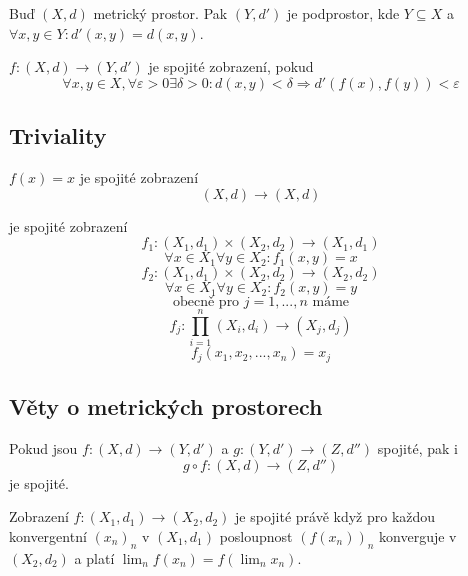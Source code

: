 \documentclass[../main.tex]{subfiles}
\begin{document}
\begin{definition}[Podprostor]
	Buď $(X, d)$ metrický prostor. Pak $(Y, d')$ je podprostor, kde $Y \subseteq X$ a $\forall x,y \in Y : d'(x,y) = d(x,y)$.
\end{definition}

\begin{definition}
	$f \colon (X,d) \to (Y, d')$ je spojité zobrazení, pokud
	\[ \forall x, y \in X, \forall \varepsilon > 0 \exists \delta > 0:
	d(x,y) < \delta \Rightarrow d'(f(x), f(y)) < \varepsilon \]
\end{definition}

\subsection{Triviality}

\begin{definition}
	$f(x) = x$ je spojité zobrazení
	\[ (X,d) \to (X,d) \]
\end{definition}

\begin{definition}
	je spojité zobrazení
	\hspace{1.2mm}
	\[ f_1\colon (X_1,d_1)\times(X_2,d_2) \rightarrow (X_1,d_1) \]
	\[\forall x\in X_1 \forall y \in X_2 : f_1(x,y) = x\]
	\[f_2 \colon (X_1,d_1)\times(X_2,d_2) \rightarrow (X_2,d_2)\]
	\[\forall x\in X_1 \forall y \in X_2 : f_2(x,y) = y\]
	\[\text{obecně pro } j=1,...,n \text{ máme}\]
	\[f_j\colon\prod^n_{i=1}(X_i,d_i)\rightarrow(X_j,d_j)\]
	\[f_j(x_1,x_2,...,x_n) = x_j\]
\end{definition}

\subsection{Věty o metrických prostorech}

\begin{theorem}
	Pokud jsou $f: (X,d) \to (Y, d')$ a $g: (Y,d') \to (Z, d'')$ spojité, pak i
	\[ g \circ f: (X,d) \to (Z,d'') \] je spojité.
\end{theorem}

\begin{theorem}
	Zobrazení $f: (X_1,d_1) \rightarrow (X_2,d_2)$ je spojité právě když pro každou konvergentní $(x_n)_n$ v $(X_1,d_1)$ 
	posloupnost $(f(x_n))_n$ konverguje v $(X_2,d_2)$ a platí $\lim_n f(x_n) = f(\lim_n x_n)$.
\end{theorem}
\end{document}
